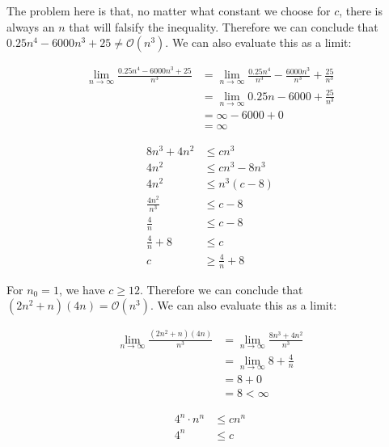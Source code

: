 The problem here is that, no matter what constant we choose for $c$, there is always an $n$ that will falsify the inequality. Therefore we can conclude that $0.25n^4 - 6000n^3 + 25 \neq \mathcal{O}(n^3)$. We can also evaluate this as a limit:

\begin{align*}
  \lim_{n \to \infty} \frac{0.25n^4 - 6000n^3 + 25}{n^3} &= \lim_{n \to \infty} \frac{0.25n^4}{n^3} - \frac{6000n^3}{n^3} + \frac{25}{n^3}\\
  &= \lim_{n \to \infty} 0.25n - 6000 + \frac{25}{n^3}\\
  &= \infty - 6000 + 0\\
  &= \infty
\end{align*}


\begin{align*}
  8n^3 + 4n^2 &\leq cn^3\\
  4n^2 &\leq cn^3 - 8n^3\\
  4n^2 &\leq n^3(c - 8)\\
  \frac{4n^2}{n^3} &\leq c - 8\\
  \frac{4}{n} &\leq c - 8\\
  \frac{4}{n} + 8 &\leq c\\
  c &\geq \frac{4}{n} + 8
\end{align*}

For $n_0 = 1$, we have $c \geq 12$. Therefore we can conclude that $(2n^2 + n)(4n) = \mathcal{O}(n^3)$. We can also evaluate this as a limit:

\begin{align*}
  \lim_{n \to \infty} \frac{(2n^2 + n)(4n)}{n^3} &= \lim_{n \to \infty} \frac{8n^3 + 4n^2}{n^3}\\
  &= \lim_{n \to \infty} 8 + \frac{4}{n}\\
  &= 8 + 0\\
  &= 8 < \infty
\end{align*}


\begin{align*}
  4^n \cdot n^n &\leq cn^n\\
  4^n &\leq c
\end{align*}

